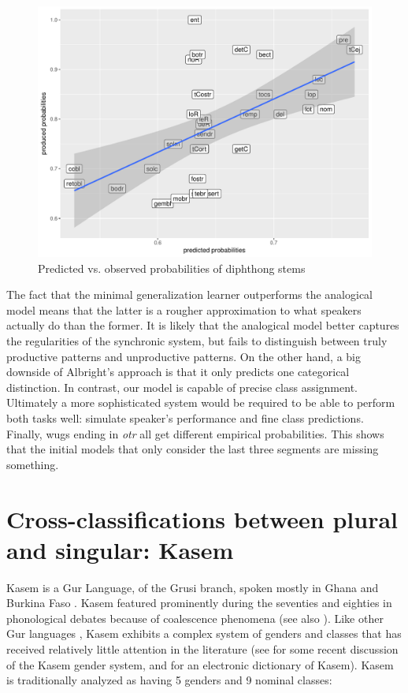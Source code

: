 \begin{figure}
  \centering
  \includegraphics[scale=0.6]{./figures/spanish/corr-plot.pdf}
  \caption{Predicted vs. observed probabilities of diphthong stems}\label{fig:corr-plot}
\end{figure}

The fact that the minimal generalization learner outperforms the analogical model means that the latter is a rougher approximation to what speakers actually do than the former. It is likely that the analogical model better captures the regularities of the synchronic system, but fails to distinguish between truly productive patterns and unproductive patterns. On the other hand, a big downside of Albright's approach is that it only predicts one categorical distinction. In contrast, our model is capable of precise class assignment. Ultimately a more sophisticated system would be required to be able to perform both tasks well: simulate speaker's performance and fine class predictions. Finally, wugs ending in \textit{otr} all get different empirical probabilities. This shows that the initial models that only consider the last three segments are missing something.


\section{Cross-classifications between plural and singular: Kasem}


Kasem is a Gur Language, of the Grusi branch, spoken mostly in Ghana and Burkina Faso \autocite{Naden.1988}. Kasem featured prominently during the seventies and eighties in phonological debates \autocites{Phelps.1975, Phelps.1979, Halle.1978, deHaas.1987, deHaas.1988} because of coalescence phenomena (see also \citealt{Zaleska.forth.}). Like other Gur languages \autocite{Naden.1989}, Kasem exhibits a complex system of genders and classes that has received relatively little attention in the literature (see \textcite{Awedoba.2003} for some recent discussion of the Kasem gender system, and \textcite{Niggli.2016} for an electronic dictionary of Kasem). Kasem is traditionally analyzed as having 5 genders and 9 nominal classes:

